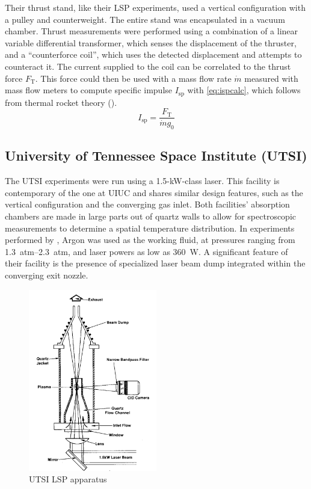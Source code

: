             Their thrust stand, like their LSP experiments, used a vertical configuration with a pulley and counterweight. The entire stand was encapsulated in a vacuum chamber. Thrust measurements were performed using  a combination of a linear variable differential transformer, which senses the displacement of the thruster, and a ``counterforce coil'', which uses the detected displacement and attempts to counteract it. The current supplied to the coil can be correlated to the thrust force $F_\text{T}$. This force could then be used with a mass flow rate $\dot{m}$ measured with mass flow meters to compute specific impulse $I_\text{sp}$ with \autoref{eq:ispcalc}, which follows from thermal rocket theory (\textcite{zandbergenAE4S01ThermalRocket2020}).
            \begin{equation}
                I_\text{sp} = \frac{F_\text{T}}{\dot{m}g_0}
                \label{eq:ispcalc}
            \end{equation}

        \subsection{University of Tennessee Space Institute (UTSI)}
            The UTSI experiments were run using a 1.5-kW-class  laser. This facility is contemporary of the one at UIUC and shares similar design features, such as the vertical configuration and the converging gas inlet. Both facilities' absorption chambers are made in large parts out of quartz walls to allow for spectroscopic measurements to determine a spatial temperature distribution. In experiments performed by \textcite{keeferPowerAbsorptionLasersustained1986}, Argon was used as the working fluid, at pressures ranging from \qtyrange{1.3}{2.3}{atm}, and laser powers as low as 360~W. A significant feature of their facility is the presence of specialized laser beam dump integrated within the converging exit nozzle.

            \begin{figure}[h]
                \centering
                \includegraphics[width=0.5\textwidth]{assets/2 background/utsi_facility.png}
                \caption[UTSI LSP apparatus]{UTSI LSP apparatus \cite{keeferPowerAbsorptionLasersustained1986}}
                \label{fig:4_utsiExp}
            \end{figure}

